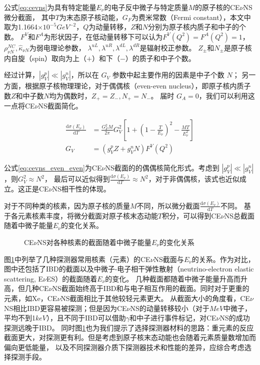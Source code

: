 公式\ref*{eq:cevns}为具有特定能量$E_{\nu}$的电子反中微子与特定质量$M$的原子核的CE$\nu$NS微分截面，
其中$T$为末态原子核动能，$G_F$为费米常数（Fermi constant），本文中取为1.1664$\times10^{-5}\si{GeV}^{-2}$，$Q$为动量转移，$Z$和$N$分别为原子核内质子和中子的个数。
$F^V$和$F^A$为形状因子，在低动量转移下可以认为$F^V(Q^2)=F^A(Q^2)=1$\cite{lewin_review_1996}，
$\rho_{\nu N}^{NC},\hat{\kappa}_{\nu N}$为弱电理论参数，
$\lambda^{uL},\lambda^{uR},\lambda^{dL},\lambda^{dR}$是辐射校正参数\cite{barranco_probing_2005}。
$Z_{\pm}$和$N_{\pm}$是原子核内自旋（spin）取向为上（$+$）和下（$-$）的质子和中子个数。

经过计算，$|g_V^p|\ll|g_V^n|$，所以在 $G_V$ 参数中起主要作用的因素是中子个数 $N$；
另一方面，根据原子核物理理论，对于偶偶核（even-even nucleus），即原子核内质子数$Z$和中子数$N$均为偶数时，$Z_{+}=Z_{-},N_{+}=N_{-}$。
届时 $G_A=0$，我们可以利用这一点将CE$\nu$NS截面简化。

\begin{align}
    \label{eq:cevns_even_even}
    \frac{\mathrm{d}\sigma(E_\nu)}{\mathrm{d}T} &= \frac{G_F^2 M}{2\pi}G_V^2\left[1+(1-\frac{T}{E_{\nu}})^2-\frac{MT}{E_{\nu}^2}\right] \\
    G_V &= (g_V^p Z+g_V^n N)F^V(Q^2)
\end{align}

公式\ref{eq:cevns_even_even}为CE$\nu$NS截面的的偶偶核简化形式。考虑到 $|g_V^p|\ll|g_V^n|$，则$G_V^2\approx N^2$，
最后可以近似得到$\frac{\mathrm{d}\sigma(E_\nu)}{\mathrm{d}T}\approx N^2$，对于非偶偶核，该式也近似成立。这正是CE$\nu$NS相干性的体现。

对于不同种类的核素，因为原子核的质量$M$不同，所以微分截面$\frac{\mathrm{d}\sigma(E_\nu)}{\mathrm{d}T}$不同。
基于各元素核素丰度\cite{lide2004crc}，将微分截面对原子核末态动能$T$积分，可以得到CE$\nu$NS总截面随着中微子能量$E_{\nu}$的变化关系。

\begin{figure}
    \centering
    
    \caption{\label{fig:xsec_elements} CE$\nu$NS对各种核素的截面随着中微子能量$E_{\nu}$的变化关系}
\end{figure}

图\ref{fig:xsec_elements}中列举了几种探测器常用核素（元素）的CE$\nu$NS截面与$E_{\nu}$的关系。作为对比，图中还包括了IBD\cite{akimov_observation_2017}的截面以及中微子-电子相干弹性散射（neutrino-electron elastic scattering, E$\nu$ES）的截面随着$E_{\nu}$的变化。
几种截面都随着中微子能量升高而升高，但几种CE$\nu$NS截面始终高于IBD和与电子相互作用的截面。同时对于更重的元素，如$\mathrm{Xe}$，CE$\nu$NS截面相比于其他较轻元素更大。
从截面大小的角度看，CE$\nu$NS相比IBD更容易被探测；但是因为CE$\nu$NS的动量转移较小（对于$\si{MeV}$中微子，平均不到1$\si{keV}$），且不同于IBD可以借助$\gamma$和中子进行事件标记，对CE$\nu$NS的成功探测远晚于IBD。
同时图\ref{fig:xsec_elements}也为我们提示了选择探测器材料的思路：重元素的反应截面更大，对探测更有利。但是考虑到原子核末态动能也会随着元素质量数增加而偏向更低能量，
以及不同探测器介质下探测器技术和性能的差异，应综合考虑选择探测手段。

